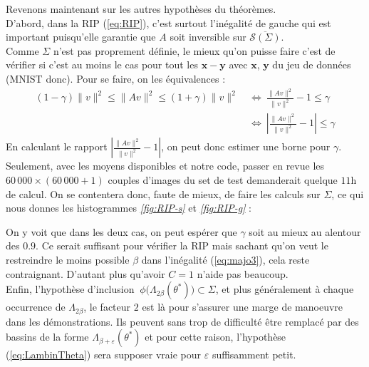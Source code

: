 \documentclass[hidelinks, french]{article} %
\newcommand{\Llr}{\Longleftrightarrow}
\renewcommand{\epsilon}{\varepsilon}
\renewcommand{\leq}{\leqslant}
\renewcommand{\bf}[1]{\boldsymbol{#1}}
\theoremstyle{enonce}
\theoremstyle{special}
\theoremstyle{rq}
\theoremstyle{exo}
\theoremstyle{demo}
\begin{document}
Revenons maintenant sur les autres hypothèses du théorèmes. 
\\
D'abord, dans la RIP (\ref{eq:RIP}), c'est surtout l'inégalité de gauche qui est important puisqu'elle garantie que $A$ soit inversible sur $\overline{\mathcal{S}(\Sigma)}$.
\\
Comme $\Sigma$ n'est pas proprement définie, le mieux qu'on puisse faire c'est de vérifier si c'est au moins le cas pour tout les $\bf{x}-\bf{y}$ avec $\bf{x}$, $\bf{y}$ du jeu de données (MNIST donc). Pour se faire, on les équivalences :
\begin{align*}(1-\gamma)\|v\|^2\leq \|Av\|^2\leq (1+\gamma)\|v\|^2\ &\Llr\ \frac{\|Av\|^2}{\|v\|^2}-1\leq \gamma\\
    &\Llr\ \left|\frac{\|Av\|^2}{\|v\|^2}-1\right|\leq \gamma\end{align*}
En calculant le rapport $\left|\frac{\|Av\|^2}{\|v\|^2}-1\right|$, on peut donc estimer une borne pour $\gamma$. Seulement, avec les moyens disponibles et notre code, passer en revue les $60\,000\times(60\,000+1)$ couples d'images du set de test demanderait quelque $11$h de calcul. On se contentera donc, faute de mieux, de faire les calculs sur $\Sigma$, ce qui nous donnes les histogrammes \textit{\ref{fig:RIP-s}} et \textit{\ref{fig:RIP-g}} :
\\

\begin{figure}[h]
\begin{floatrow}
{}

{}
\end{floatrow}\end{figure}

\noindent On y voit que dans les deux cas, on peut espérer que $\gamma$ soit au mieux au alentour des $0.9$. Ce serait suffisant pour vérifier la RIP mais sachant qu'on veut le restreindre le moins possible $\beta$ dans l'inégalité (\ref{eq:majo3}), cela reste contraignant. D'autant plus qu'avoir $C=1$ n'aide pas beaucoup.
\\

Enfin, l'hypothèse d'inclusion $\ \phi\big(\Lambda_{2\beta}(\theta^*)\big)\subset\Sigma$, et plus généralement à chaque occurrence de $\Lambda_{2\beta}$, le facteur $2$ est là pour s'assurer une marge de manoeuvre dans les démonstrations. Ils peuvent sans trop de difficulté être remplacé par des bassins de la forme $\Lambda_{\beta+\epsilon}(\theta^*)$ et pour cette raison, l’hypothèse (\ref{eq:LambinTheta}) sera supposer vraie pour $\epsilon$ suffisamment petit.
\\
\end{document}
